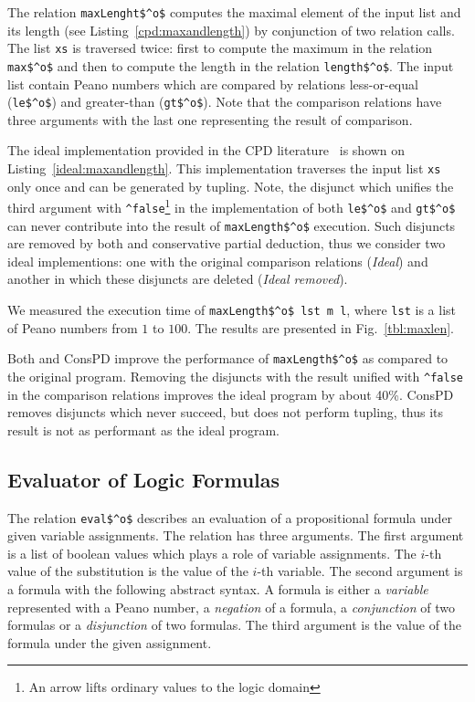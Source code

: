 The relation \lstinline{maxLenght$^o$} computes the maximal element of the input list and its length (see Listing~\ref{cpd:maxandlength}) by conjunction of two relation calls.
The list \lstinline{xs} is traversed twice: first to compute the maximum in the relation \lstinline{max$^o$} and then to compute the length in the relation \lstinline{length$^o$}.
The input list contain Peano numbers which are compared by relations less-or-equal (\lstinline{le$^o$}) and greater-than (\lstinline{gt$^o$}).
Note that the comparison relations have three arguments with the last one representing the result of comparison.

The ideal implementation provided in the CPD literature~\cite{de1999conjunctive} is shown on Listing~\ref{ideal:maxandlength}.
This implementation traverses the input list \lstinline{xs} only once and can be generated by tupling.
Note, the disjunct which unifies the third argument with \lstinline{^false}\footnote{An arrow lifts ordinary values to the logic domain} in the implementation of both \lstinline{le$^o$} and \lstinline{gt$^o$} can never contribute into the result of \lstinline{maxLength$^o$} execution.
Such disjuncts are removed by both \ecce and conservative partial deduction, thus we consider two ideal implementions: one with the original comparison relations (\emph{Ideal}) and another in which these disjuncts are deleted (\emph{Ideal removed}).

We measured the execution time of \lstinline{maxLength$^o$ lst m l}, where \lstinline{lst} is a list of Peano numbers from $1$ to $100$.
The results are presented in Fig.~\ref{tbl:maxlen}.

Both \ecce and ConsPD improve the performance of \lstinline{maxLength$^o$} as compared to the original program.
Removing the disjuncts with the result unified with \lstinline{^false} in the comparison relations improves the ideal program by about 40\%.
ConsPD removes disjuncts which never succeed, but does not perform tupling, thus its result is not as performant as the ideal program.


\subsection{Evaluator of Logic Formulas}

The relation \lstinline{eval$^o$} describes an evaluation of a propositional formula under given variable assignments.
The relation has three arguments. The first argument is a list of boolean values which plays a role of variable assignments.
The $i$-th value of the substitution is the value of the $i$-th variable.
The second argument is a formula with the following abstract syntax.
A formula is either a \emph{variable} represented with a Peano number, a \emph{negation} of a formula, a \emph{conjunction} of two formulas or a \emph{disjunction} of two formulas.
The third argument is the value of the formula under the given assignment.

